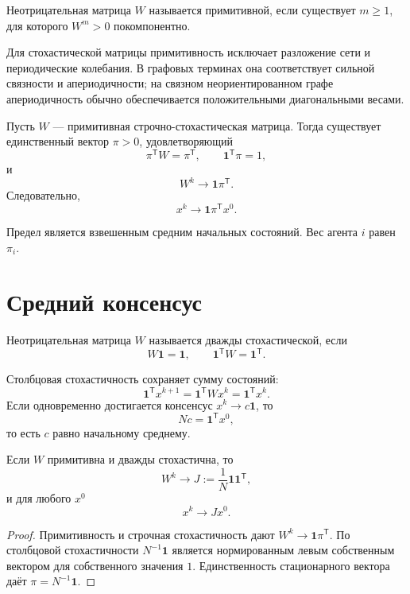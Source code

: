 \begin{definition}[Примитивность]
Неотрицательная матрица \(W\) называется примитивной, если существует
\(m\ge1\), для которого \(W^m>0\) покомпонентно.
\end{definition}

Для стохастической матрицы примитивность исключает разложение сети и
периодические колебания. В графовых терминах она соответствует
сильной связности и апериодичности; на связном неориентированном графе
апериодичность обычно обеспечивается положительными диагональными
весами.

\begin{theorem}
Пусть \(W\) --- примитивная строчно-стохастическая матрица. Тогда
существует единственный вектор \(\pi>0\), удовлетворяющий
\[
    \pi^{\mathsf T}W=\pi^{\mathsf T},
    \qquad
    \mathbf1^{\mathsf T}\pi=1,
\]
и
\[
    W^k\longrightarrow\mathbf1\pi^{\mathsf T}.
\]
Следовательно,
\[
    x^k\longrightarrow
    \mathbf1\pi^{\mathsf T}x^0.
\]
\end{theorem}

Предел является взвешенным средним начальных состояний. Вес агента
\(i\) равен \(\pi_i\).

\section{Средний консенсус}

\begin{definition}
Неотрицательная матрица \(W\) называется дважды стохастической, если
\[
    W\mathbf1=\mathbf1,
    \qquad
    \mathbf1^{\mathsf T}W=\mathbf1^{\mathsf T}.
\]
\end{definition}

Столбцовая стохастичность сохраняет сумму состояний:
\[
    \mathbf1^{\mathsf T}x^{k+1}
    =
    \mathbf1^{\mathsf T}Wx^k
    =
    \mathbf1^{\mathsf T}x^k.
\]
Если одновременно достигается консенсус \(x^k\to c\mathbf1\), то
\[
    Nc=\mathbf1^{\mathsf T}x^0,
\]
то есть \(c\) равно начальному среднему.

\begin{theorem}
Если \(W\) примитивна и дважды стохастична, то
\[
    W^k
    \longrightarrow
    J
    :=
    \frac1N\mathbf1\mathbf1^{\mathsf T},
\]
и для любого \(x^0\)
\[
    x^k\longrightarrow Jx^0.
\]
\end{theorem}

\begin{proof}
Примитивность и строчная стохастичность дают
\(W^k\to\mathbf1\pi^{\mathsf T}\). По столбцовой стохастичности
\(N^{-1}\mathbf1\) является нормированным левым собственным вектором
для собственного значения \(1\). Единственность стационарного вектора
даёт \(\pi=N^{-1}\mathbf1\).
\end{proof}

